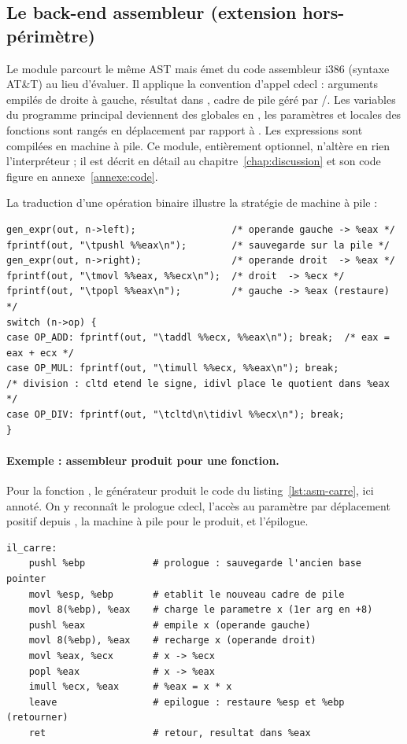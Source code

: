 \subsection{Le back-end assembleur (extension hors-périmètre)}

Le module  parcourt le même AST mais émet du code assembleur i386
(syntaxe AT\&T) au lieu d'évaluer. Il applique la convention d'appel cdecl :
arguments empilés de droite à gauche, résultat dans , cadre de pile
géré par /. Les variables du programme principal deviennent
des globales en , les paramètres et locales des fonctions sont rangés
en déplacement par rapport à . Les expressions sont compilées en
machine à pile. Ce module, entièrement optionnel, n'altère en rien
l'interpréteur ; il est décrit en détail au chapitre~\ref{chap:discussion} et son
code figure en annexe~\ref{annexe:code}.

La traduction d'une opération binaire illustre la stratégie de machine à pile :

\begin{lstlisting}[style=c,caption={Génération d'un binop en machine à pile (extrait de \code{codegen.c}).}]
gen_expr(out, n->left);                 /* operande gauche -> %eax */
fprintf(out, "\tpushl %%eax\n");        /* sauvegarde sur la pile */
gen_expr(out, n->right);                /* operande droit  -> %eax */
fprintf(out, "\tmovl %%eax, %%ecx\n");  /* droit  -> %ecx */
fprintf(out, "\tpopl %%eax\n");         /* gauche -> %eax (restaure) */
switch (n->op) {
case OP_ADD: fprintf(out, "\taddl %%ecx, %%eax\n"); break;  /* eax = eax + ecx */
case OP_MUL: fprintf(out, "\timull %%ecx, %%eax\n"); break;
/* division : cltd etend le signe, idivl place le quotient dans %eax */
case OP_DIV: fprintf(out, "\tcltd\n\tidivl %%ecx\n"); break;
}
\end{lstlisting}

\paragraph{Exemple : assembleur produit pour une fonction.} Pour la fonction
, le générateur produit le code du
listing~\ref{lst:asm-carre}, ici annoté. On y reconnaît le prologue cdecl, l'accès
au paramètre par déplacement positif depuis , la machine à pile pour
le produit, et l'épilogue.

\begin{lstlisting}[style=asm,caption={Assembleur généré pour \code{carre} (annoté).},label={lst:asm-carre}]
il_carre:
    pushl %ebp            # prologue : sauvegarde l'ancien base pointer
    movl %esp, %ebp       # etablit le nouveau cadre de pile
    movl 8(%ebp), %eax    # charge le parametre x (1er arg en +8)
    pushl %eax            # empile x (operande gauche)
    movl 8(%ebp), %eax    # recharge x (operande droit)
    movl %eax, %ecx       # x -> %ecx
    popl %eax             # x -> %eax
    imull %ecx, %eax      # %eax = x * x
    leave                 # epilogue : restaure %esp et %ebp (retourner)
    ret                   # retour, resultat dans %eax
\end{lstlisting}

